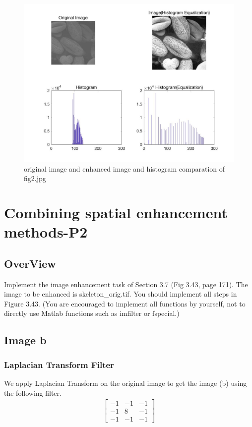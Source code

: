 \documentclass[11pt,oneside]{book}
\begin{document}
\begin{figure}[!htb]
   \centering  
   \includegraphics[width=1.0\textwidth]{images/1/image2.jpg}
   \caption{original image and enhanced image and histogram comparation of fig2.jpg}  
\end{figure}





\chapter{Combining spatial enhancement methods-P2}
\section{OverView}
   Implement the image enhancement task of Section 3.7 (Fig 3.43, page 171). The image to be enhanced is skeleton\_orig.tif. You should implement all steps in Figure 3.43. (You are encouraged to implement all functions by yourself, not to directly use Matlab functions such as imfilter or fspecial.)

\section{Image b}
\subsection{Laplacian Transform Filter}
We apply Laplacian Transform on the original image to get the image (b) using the following filter.
\begin{gather*}
\begin{bmatrix} -1&-1&-1 \\ -1&8&-1 \\ -1&-1&-1\end{bmatrix}
\end{gather*}
\end{document}
